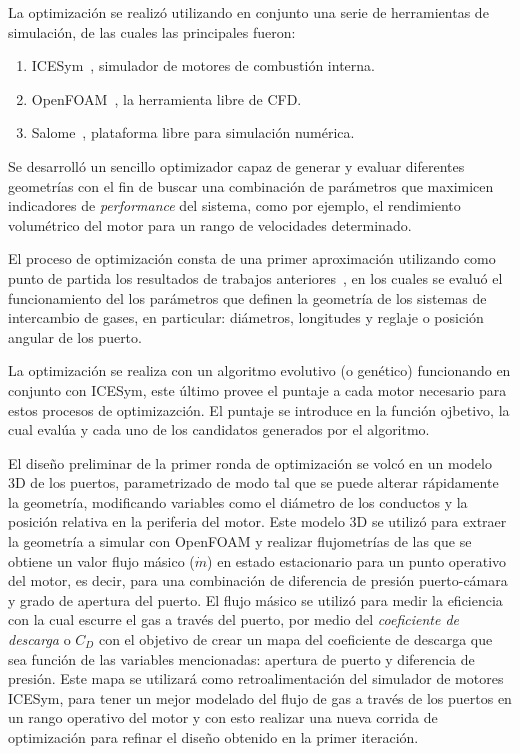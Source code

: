 La optimización se realizó utilizando en conjunto una serie de herramientas de
simulación, de las cuales las principales fueron:

\begin{enumerate}
    \item ICESym~\parencite{icesym}, simulador de motores de combustión interna.
    \item OpenFOAM~\parencite{openfoam}, la herramienta libre de CFD.
    \item Salome~\parencite{salome}, plataforma libre para simulación numérica.
\end{enumerate}

Se desarrolló un sencillo optimizador capaz de generar y evaluar diferentes
geometrías con el fin de buscar una combinación de parámetros que maximicen
indicadores de \emph{performance} del sistema, como por ejemplo, el rendimiento
volumétrico del motor para un rango de velocidades determinado.

El proceso de optimización consta de una primer aproximación utilizando como
punto de partida los resultados de trabajos anteriores~\parencite{lopez13}, en
los cuales se evaluó el funcionamiento del los parámetros que definen la
geometría de los sistemas de intercambio de gases, en particular: diámetros,
longitudes y reglaje o posición angular de los puerto.

La optimización se realiza con un algoritmo evolutivo (o genético) funcionando
en conjunto con ICESym, este último provee el puntaje a cada motor
necesario para estos procesos de optimizazción.
%
El puntaje se introduce en la función ojbetivo, la cual evalúa y cada uno de
los candidatos generados por el algoritmo.

El diseño preliminar de la primer ronda de optimización se volcó en un modelo
3D de los puertos, parametrizado de modo tal que se puede alterar rápidamente
la geometría, modificando variables como el diámetro de los conductos y la
posición relativa en la periferia del motor.
%
Este modelo 3D se utilizó para extraer la geometría a simular con OpenFOAM y
realizar flujometrías de las que se obtiene un valor flujo másico ($\dot{m}$) en
estado estacionario para un punto operativo del motor, es decir, para una
combinación de diferencia de presión puerto-cámara y grado de apertura del
puerto.
%
El flujo másico se utilizó para medir la eficiencia con la cual escurre el gas a
través del puerto, por medio del \emph{coeficiente de descarga} o $C_D$ con el
objetivo de crear un mapa del coeficiente de descarga que sea función de las
variables mencionadas: apertura de puerto y diferencia de presión.
%
Este mapa se utilizará como retroalimentación del simulador de motores ICESym,
para tener un mejor modelado del flujo de gas a través de los puertos en un
rango operativo del motor y con esto realizar una nueva corrida de optimización
para refinar el diseño obtenido en la primer iteración.

